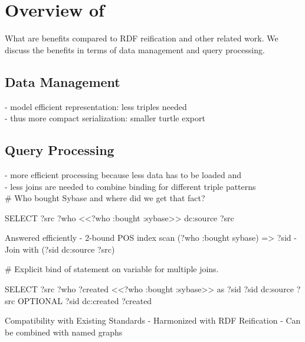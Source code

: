 \section{Overview of {\ReifiPlus}} \label{Section:Discussion}
What are benefits compared to RDF reification and other related work. We discuss the benefits in terms of data management and query processing.

\subsection{Data Management}
- model efficient representation: less triples needed\\
- thus more compact serialization: smaller turtle export\\

\subsection{Query Processing}
- more efficient processing because less data has to be loaded and \\
- less joins are needed to combine binding for different triple patterns\\


 \# Who bought Sybase and where did we get that fact?

SELECT ?src ?who {
   <<?who :bought :sybase>> dc:source ?src
}

Answered efficiently
-	2-bound POS index scan (?who :bought sybase) => ?sid
-	Join with (?sid dc:source ?src)

\# Explicit bind of statement on variable for multiple joins.

SELECT ?src ?who ?created {
   <<?who :bought :sybase>> as ?sid
   ?sid dc:source ?src
   OPTIONAL {?sid dc:created ?created}
}

Compatibility with Existing Standards
-	Harmonized with RDF Reification
-	Can be combined with named graphs

